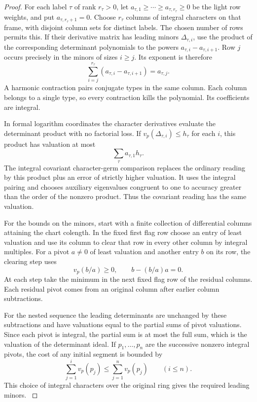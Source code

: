 \begin{proof}
For each label \(\tau\) of rank \(r_\tau>0\), let
\(a_{\tau,1}\ge\cdots\ge a_{\tau,r_\tau}\ge0\) be the
light row weights, and put \(a_{\tau,r_\tau+1}=0\).
Choose \(r_\tau\) columns of integral characters on that
frame, with disjoint column sets for distinct labels.
The chosen number of rows permits this. If their derivative
matrix has leading minors \(\Delta_{\tau,i}\), use the
product of the corresponding determinant polynomials to
the powers \(a_{\tau,i}-a_{\tau,i+1}\).
Row \(j\) occurs precisely in the minors of sizes \(i\ge j\).
Its exponent is therefore
\[
 \sum_{i=j}^{r_\tau}(a_{\tau,i}-a_{\tau,i+1})=a_{\tau,j}.
\] A harmonic
contraction pairs conjugate types in the same column.
Each column belongs to a single type, so every contraction
kills the polynomial. Its coefficients are integral.

In formal logarithm coordinates the character derivatives
evaluate the determinant product with no factorial loss.
If \(v_p(\Delta_{\tau,i})\le h_\tau\) for each \(i\), this
product has valuation at most 
\[
  \sum_\tau a_{\tau,1}h_\tau.
\]
The integral covariant character-germ comparison replaces the
ordinary reading by this product plus an error of strictly
higher valuation. It uses the integral pairing and chooses
auxiliary eigenvalues congruent to one to accuracy greater
than the order of the nonzero product. Thus the covariant
reading has the same valuation.
\label{cor:slice-unscaled-depth-2}

For the bounds on the minors, start with a finite collection
of differential columns attaining the chart colength.
In the fixed first flag row choose an entry of least valuation
and use its column to clear that row in every other column
by integral multiples.
For a pivot \(a\ne0\) of least valuation and another entry \(b\) on its row, the clearing step uses
\[
  v_p(b/a)\ge0,\qquad b-(b/a)a=0 .
\]
 At each step take the minimum in the
next fixed flag row of the residual columns. Each residual pivot comes from an original
column after earlier column subtractions.

For the nested
sequence the leading determinants are unchanged by these
subtractions and have valuations equal to the partial sums
of pivot valuations. Since each pivot is integral, the
partial sum is at most the full sum, which is the valuation
of the determinant ideal.
If \(p_1,\ldots,p_n\) are the successive nonzero integral pivots, the cost of any initial segment is bounded by
\[
  \sum_{j=1}^{i}v_p(p_j)\le\sum_{j=1}^{n}v_p(p_j)\qquad(i\le n).
\]
 This choice of integral characters over the original ring gives the required leading minors.
\label{cor:slice-unscaled-depth-3}


\end{proof}
